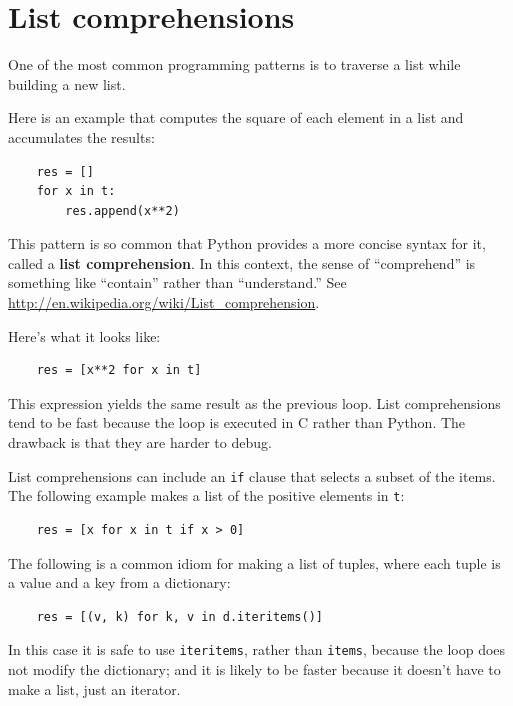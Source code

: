 \documentclass[10pt]{book}
\begin{document}
\section{List comprehensions}

One of the most common programming patterns is to traverse
a list while building a new list.

Here is an example that computes the square of each element in
a list and accumulates the results:

\begin{verbatim}
    res = []
    for x in t:
        res.append(x**2)
\end{verbatim}

This pattern is so common that Python provides a more
concise syntax for it, called a {\bf list comprehension}.
In this context, the sense of ``comprehend'' is something
  like ``contain'' rather than ``understand.''  See
  \url{http://en.wikipedia.org/wiki/List_comprehension}.

Here's what it looks like:

\begin{verbatim}
    res = [x**2 for x in t]
\end{verbatim}

This expression yields the same result as the previous loop.  List
comprehensions tend to be fast because the loop is executed in C
rather than Python.  The drawback is that they are harder to debug.

List comprehensions can include an {\tt if} clause that selects a
subset of the items.  The following example makes a
list of the positive elements in {\tt t}:

\begin{verbatim}
    res = [x for x in t if x > 0]
\end{verbatim}

The following is a common idiom for making a list of tuples, where
each tuple is a value and a key from a dictionary:

\begin{verbatim}
    res = [(v, k) for k, v in d.iteritems()]
\end{verbatim}

In this case it is safe to use
{\tt iteritems}, rather than {\tt items}, because
the loop does not modify the dictionary; and it is likely to be
faster because it doesn't have to make a list, just an iterator.
\end{document}
